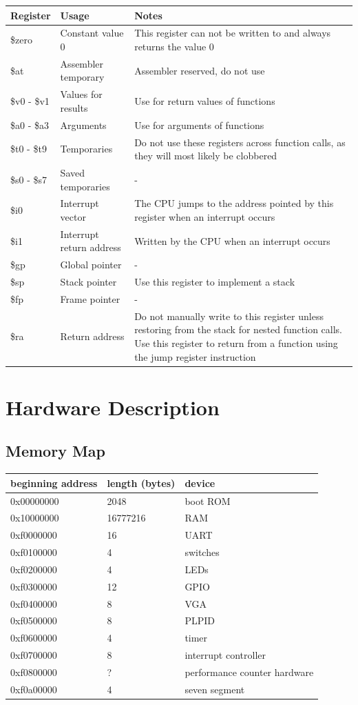 \documentclass{article}
\begin{document}
\begin{tabularx}{\linewidth}{|X|X|X|}
\hline
Register & Usage & Notes \\
\hline
\$zero	& Constant value 0 & This register can not be written to and always returns the value 0 \\
\$at	& Assembler temporary &	Assembler reserved, do not use \\
\$v0 - \$v1 &	Values for results &	Use for return values of functions \\
\$a0 - \$a3 &	Arguments &	Use for arguments of functions \\
\$t0 - \$t9 &	Temporaries &	Do not use these registers across function calls, as they will most likely be clobbered \\
\$s0 - \$s7 &	Saved temporaries &	- \\
\$i0 &	Interrupt vector &	The CPU jumps to the address pointed by this register when an interrupt occurs \\
\$i1 &	Interrupt return address &	Written by the CPU when an interrupt occurs \\
\$gp &	Global pointer &	- \\
\$sp &	Stack pointer &	Use this register to implement a stack \\
\$fp &	Frame pointer & - \\
\$ra &	Return address & Do not manually write to this register unless restoring from the stack for nested function calls. Use this register to return from a function using the jump register instruction \\
\hline
\end{tabularx}

\section{Hardware Description}
\subsection{Memory Map}
\begin{tabular}{| l | l | l |}
\hline
\textbf{beginning address} & \textbf{length (bytes)} & device \\
\hline
0x00000000 & 2048 & boot ROM \\
0x10000000 & 16777216 & RAM \\
0xf0000000 & 16 & UART \\
0xf0100000 & 4 & switches \\
0xf0200000 & 4 & LEDs \\
0xf0300000 & 12 & GPIO \\
0xf0400000 & 8 & VGA \\
0xf0500000 & 8 & PLPID \\
0xf0600000 & 4 & timer \\
0xf0700000 & 8 & interrupt controller \\
0xf0800000 & ? & performance counter hardware \\
0xf0a00000 & 4 & seven segment \\
\hline
\end{tabular}
\end{document}
